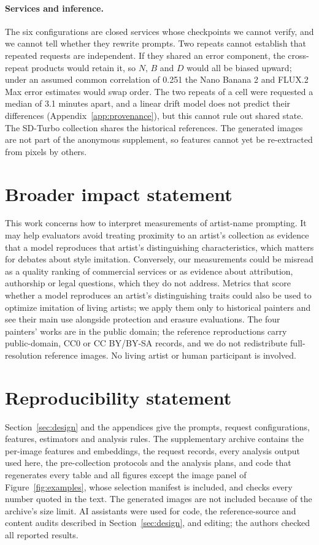 \documentclass[10pt]{article}
\begin{document}
\paragraph{Services and inference.} The six configurations are closed services whose checkpoints
we cannot verify, and we cannot tell whether they rewrite prompts. Two repeats cannot establish that
repeated requests are independent. If they shared an error component, the cross-repeat products
would retain it, so $N$, $B$ and $D$ would all be biased upward; under an assumed common correlation
of 0.251 the Nano Banana 2 and FLUX.2 Max error estimates would swap order. The two repeats of a
cell were requested a median of 3.1 minutes apart, and a linear drift model does not predict their
differences (Appendix~\ref{app:provenance}), but this cannot rule out shared state. The SD-Turbo
collection shares the historical references. The generated images are not part of the anonymous
supplement, so features cannot yet be re-extracted from pixels by others.

\section*{Broader impact statement}
This work concerns how to interpret measurements of artist-name prompting. It may help evaluators
avoid treating proximity to an artist's collection as evidence that a model reproduces that artist's
distinguishing characteristics, which matters for debates about style imitation. Conversely, our
measurements could be misread as a quality ranking of commercial services or as evidence about
attribution, authorship or legal questions, which they do not address. Metrics that score whether a
model reproduces an artist's distinguishing traits could also be used to optimize imitation of
living artists; we apply them only to historical painters and see their main use alongside
protection and erasure evaluations. The four painters' works are in the public domain; the reference
reproductions carry public-domain, CC0 or CC BY/BY-SA records, and we do not redistribute
full-resolution reference images. No living artist or human participant is involved.

\section*{Reproducibility statement}
Section~\ref{sec:design} and the appendices give the prompts, request configurations, features,
estimators and analysis rules. The supplementary archive contains the per-image features and
embeddings, the request records, every analysis output used here, the pre-collection protocols and
the analysis plans, and code that regenerates every table and all figures except the image panel of
Figure~\ref{fig:examples}, whose selection manifest is included, and checks every number quoted in
the text. The generated images are not included because of the archive's size limit. AI assistants
were used for code, the reference-source and content audits described in Section~\ref{sec:design},
and editing; the authors checked all reported results.




\clearpage
\appendix

\end{document}
